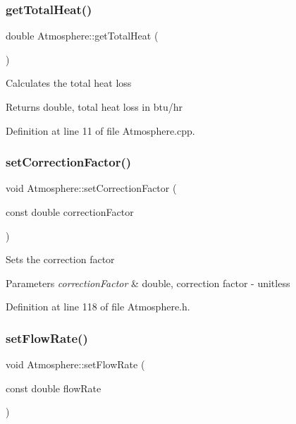 \subsubsection{\texorpdfstring{get\+Total\+Heat()}{getTotalHeat()}}
{\footnotesize\ttfamily double Atmosphere\+::get\+Total\+Heat (\begin{DoxyParamCaption}{ }\end{DoxyParamCaption})}

Calculates the total heat loss \begin{DoxyReturn}{Returns}
double, total heat loss in btu/hr 
\end{DoxyReturn}


Definition at line 11 of file Atmosphere.\+cpp.

\mbox{\label{class_atmosphere_a86fab4b05de35c9a2b1a3a7e5ab70779}} 
\subsubsection{\texorpdfstring{set\+Correction\+Factor()}{setCorrectionFactor()}}
{\footnotesize\ttfamily void Atmosphere\+::set\+Correction\+Factor (\begin{DoxyParamCaption}\item[{const double}]{correction\+Factor }\end{DoxyParamCaption})\hspace{0.3cm}{\ttfamily [inline]}}

Sets the correction factor 
\begin{DoxyParams}{Parameters}
{\em correction\+Factor} & double, correction factor -\/ unitless \\
\hline
\end{DoxyParams}


Definition at line 118 of file Atmosphere.\+h.

\mbox{\label{class_atmosphere_a9ff0b718c810aec0bb101336db69fd22}} 
\subsubsection{\texorpdfstring{set\+Flow\+Rate()}{setFlowRate()}}
{\footnotesize\ttfamily void Atmosphere\+::set\+Flow\+Rate (\begin{DoxyParamCaption}\item[{const double}]{flow\+Rate }\end{DoxyParamCaption})\hspace{0.3cm}{\ttfamily [inline]}}

